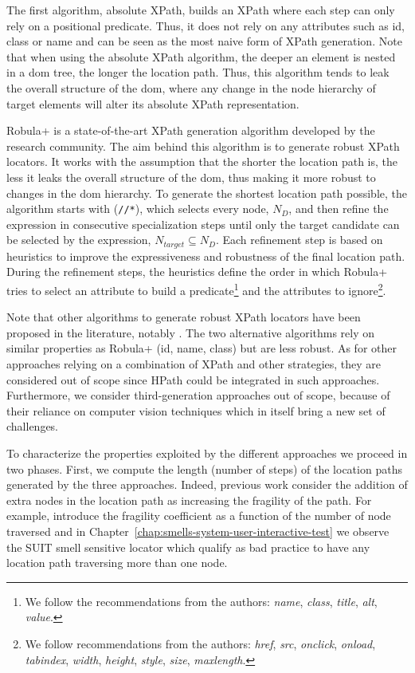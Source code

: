 The first algorithm, absolute XPath, builds an XPath where each step can only rely on a positional predicate. Thus, it does not rely on any attributes such as id, class or name and can be seen as the most naive form of XPath generation. Note that when using the absolute XPath algorithm, the deeper an element is nested in a \gls{dom} tree, the longer the location path. Thus, this algorithm tends to leak the overall structure of the \gls{dom}, where any change in the node hierarchy of target elements will alter its absolute XPath representation.

Robula+ \cite{Leotta2016} is a state-of-the-art XPath generation algorithm developed by the research community. The aim behind this algorithm is to generate robust XPath locators. It works with the assumption that the shorter the location path is, the less it leaks the overall structure of the \gls{dom}, thus making it more robust to changes in the \gls{dom} hierarchy. To generate the shortest location path possible, the algorithm starts with (\texttt{//*}), which selects every node, $N_D$, and then refine the expression in consecutive specialization steps until only the target candidate can be selected by the expression, $N_{target} \subseteq N_D$. Each refinement step is based on heuristics to improve the expressiveness and robustness of the final location path. During the refinement steps, the heuristics define the order in which Robula+ tries to select an attribute to build a predicate\footnote{We follow the recommendations from the authors: \emph{name}, \emph{class}, \emph{title}, \emph{alt}, \emph{value}.} and the attributes to ignore\footnote{We follow recommendations from the authors: \emph{href}, \emph{src}, \emph{onclick}, \emph{onload}, \emph{tabindex}, \emph{width}, \emph{height}, \emph{style}, \emph{size}, \emph{maxlength}.}.

Note that other algorithms to generate robust XPath locators have been proposed in the literature, notably \textcite{Montoto2011, Thummalapenta2013}. The two alternative algorithms rely on similar properties as Robula+ (id, name, class) but are less robust\cite{Leotta2016}. As for other approaches relying on a combination of XPath and other strategies\cite{Leotta2015, Aldalur2017}, they are considered out of scope since HPath could be integrated in such approaches. Furthermore, we consider third-generation approaches out of scope, because of their reliance on computer vision techniques which in itself bring a new set of challenges.

To characterize the properties exploited by the different approaches we proceed in two phases. First, we compute the length (number of steps) of the location paths generated by the three approaches. Indeed, previous work consider the addition of extra nodes in the location path as increasing the fragility of the path. For example, \textcite{Leotta2015} introduce the fragility coefficient as a function of the number of node traversed and in Chapter~\ref{chap:smells-system-user-interactive-test} we observe the SUIT smell sensitive locator which qualify as bad practice to have any location path traversing more than one node.

